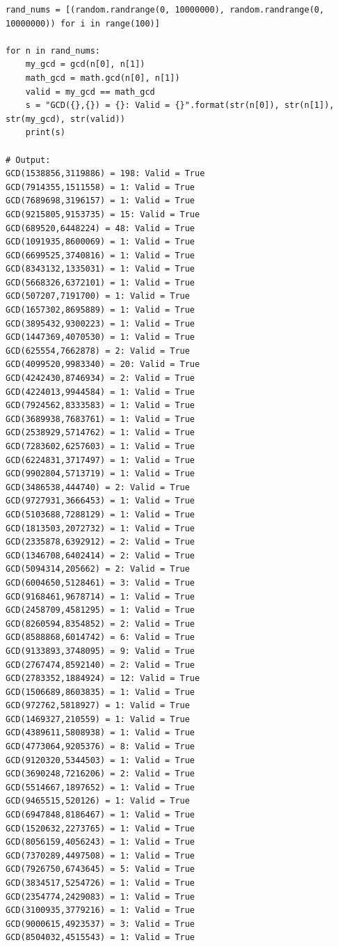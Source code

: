 \documentclass{article}
\begin{document}
\begin{enumerate}
\begin{enumerate}
\begin{lstlisting}
rand_nums = [(random.randrange(0, 10000000), random.randrange(0, 10000000)) for i in range(100)]

for n in rand_nums:
    my_gcd = gcd(n[0], n[1])
    math_gcd = math.gcd(n[0], n[1])
    valid = my_gcd == math_gcd
    s = "GCD({},{}) = {}: Valid = {}".format(str(n[0]), str(n[1]), str(my_gcd), str(valid))
    print(s)

# Output:
GCD(1538856,3119886) = 198: Valid = True
GCD(7914355,1511558) = 1: Valid = True
GCD(7689698,3196157) = 1: Valid = True
GCD(9215805,9153735) = 15: Valid = True
GCD(689520,6448224) = 48: Valid = True
GCD(1091935,8600069) = 1: Valid = True
GCD(6699525,3740816) = 1: Valid = True
GCD(8343132,1335031) = 1: Valid = True
GCD(5668326,6372101) = 1: Valid = True
GCD(507207,7191700) = 1: Valid = True
GCD(1657302,8695889) = 1: Valid = True
GCD(3895432,9300223) = 1: Valid = True
GCD(1447369,4070530) = 1: Valid = True
GCD(625554,7662878) = 2: Valid = True
GCD(4099520,9983340) = 20: Valid = True
GCD(4242430,8746934) = 2: Valid = True
GCD(4224013,9944584) = 1: Valid = True
GCD(7924562,8333583) = 1: Valid = True
GCD(3689938,7683761) = 1: Valid = True
GCD(2538929,5714762) = 1: Valid = True
GCD(7283602,6257603) = 1: Valid = True
GCD(6224831,3717497) = 1: Valid = True
GCD(9902804,5713719) = 1: Valid = True
GCD(3486538,444740) = 2: Valid = True
GCD(9727931,3666453) = 1: Valid = True
GCD(5103688,7288129) = 1: Valid = True
GCD(1813503,2072732) = 1: Valid = True
GCD(2335878,6392912) = 2: Valid = True
GCD(1346708,6402414) = 2: Valid = True
GCD(5094314,205662) = 2: Valid = True
GCD(6004650,5128461) = 3: Valid = True
GCD(9168461,9678714) = 1: Valid = True
GCD(2458709,4581295) = 1: Valid = True
GCD(8260594,8354852) = 2: Valid = True
GCD(8588868,6014742) = 6: Valid = True
GCD(9133893,3748095) = 9: Valid = True
GCD(2767474,8592140) = 2: Valid = True
GCD(2783352,1884924) = 12: Valid = True
GCD(1506689,8603835) = 1: Valid = True
GCD(972762,5818927) = 1: Valid = True
GCD(1469327,210559) = 1: Valid = True
GCD(4389611,5808938) = 1: Valid = True
GCD(4773064,9205376) = 8: Valid = True
GCD(9120320,5344503) = 1: Valid = True
GCD(3690248,7216206) = 2: Valid = True
GCD(5514667,1897652) = 1: Valid = True
GCD(9465515,520126) = 1: Valid = True
GCD(6947848,8186467) = 1: Valid = True
GCD(1520632,2273765) = 1: Valid = True
GCD(8056159,4056243) = 1: Valid = True
GCD(7370289,4497508) = 1: Valid = True
GCD(7926750,6743645) = 5: Valid = True
GCD(3834517,5254726) = 1: Valid = True
GCD(2354774,2429083) = 1: Valid = True
GCD(3100935,3779216) = 1: Valid = True
GCD(9000615,4923537) = 3: Valid = True
GCD(8504032,4515543) = 1: Valid = True

\end{lstlisting}
\end{enumerate}
\end{enumerate}
\end{document}
